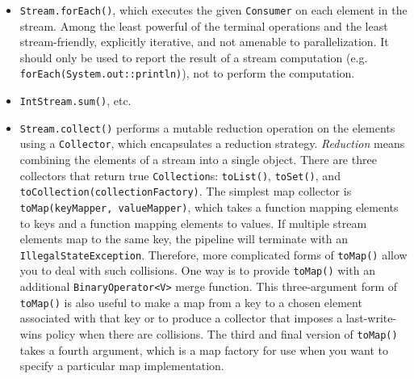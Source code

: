 \documentclass[table, xcdraw]{article}%
\begin{document}
\begin{itemize}
    \item \texttt{Stream.forEach()}, which executes the given \texttt{Consumer} on each element in the stream. Among the least powerful of the terminal operations and the least stream-friendly, explicitly iterative, and not amenable to parallelization. It should only be used to report the result of a stream computation (e.g. \texttt{forEach(System.out::println)}), not to perform the computation.
    \item \texttt{IntStream.sum()}, etc.
    \item \texttt{Stream.collect()} performs a mutable reduction operation on the elements using a \texttt{Collector}, which encapsulates a reduction strategy. \emph{Reduction} means combining the elements of a stream into a single object. There are three collectors that return true \texttt{Collection}s: \texttt{toList()}, \texttt{toSet()}, and \texttt{toCollection(collectionFactory)}. The simplest map collector is \texttt{toMap(keyMapper, valueMapper)}, which takes a function mapping elements to keys and a function mapping elements to values. If multiple stream elements map to the same key, the pipeline will terminate with an \texttt{IllegalStateException}. Therefore, more complicated forms of \texttt{toMap()} allow you to deal with such collisions. One way is to provide \texttt{toMap()} with an additional \texttt{BinaryOperator<V>} merge function. This three-argument form of \texttt{toMap()} is also useful to make a map from a key to a chosen element associated with that key or to produce a collector that imposes a last-write-wins policy when there are collisions. The third and final version of \texttt{toMap()} takes a fourth argument, which is a map factory for use when you want to specify a particular map implementation.\\

\end{itemize}
\end{document}
